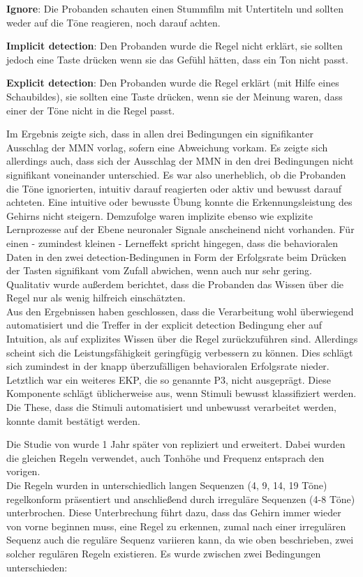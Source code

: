 \documentclass[doc,a4paper,12pt]{apa6}
\begin{document}
\begin{compactitem}
  \item \textbf{Ignore}: Die Probanden schauten einen Stummfilm mit Untertiteln und sollten weder auf die Töne reagieren, noch darauf achten.
  \item \textbf{Implicit detection}: Den Probanden wurde die Regel nicht erklärt, sie sollten jedoch eine Taste drücken wenn sie das Gefühl hätten, dass ein Ton nicht passt.
  \item \textbf{Explicit detection}: Den Probanden wurde die Regel erklärt (mit Hilfe eines Schaubildes), sie sollten eine Taste drücken, wenn sie der Meinung waren, dass einer der Töne nicht in die Regel passt.
\end{compactitem}

Im Ergebnis zeigte sich, dass in allen drei Bedingungen ein signifikanter Ausschlag der MMN vorlag, sofern eine Abweichung vorkam. Es zeigte sich allerdings auch, dass sich der Ausschlag der MMN in den drei Bedingungen nicht signifikant voneinander unterschied. Es war also unerheblich, ob die Probanden die Töne ignorierten, intuitiv darauf reagierten oder aktiv und bewusst darauf achteten. Eine intuitive oder bewusste Übung konnte die Erkennungsleistung des Gehirns nicht steigern. Demzufolge waren implizite ebenso wie explizite Lernprozesse auf der Ebene neuronaler Signale anscheinend nicht vorhanden. Für einen - zumindest kleinen - Lerneffekt spricht hingegen, dass die behavioralen Daten in den zwei detection-Bedingunen in Form der Erfolgsrate beim Drücken der Tasten signifikant vom Zufall abwichen, wenn auch nur sehr gering. Qualitativ wurde außerdem berichtet, dass die Probanden das Wissen über die Regel nur als wenig hilfreich einschätzten.\\
Aus den Ergebnissen haben \textcite{paavilainen2007preattentive} geschlossen, dass die Verarbeitung wohl überwiegend automatisiert und die Treffer in der explicit detection Bedingung eher auf Intuition, als auf explizites Wissen über die Regel zurückzuführen sind. Allerdings scheint sich die  Leistungsfähigkeit geringfügig verbessern zu können. Dies schlägt sich zumindest in der knapp überzufälligen behavioralen Erfolgsrate nieder. Letztlich war ein weiteres EKP, die so genannte P3, nicht ausgeprägt. Diese Komponente schlägt üblicherweise aus, wenn Stimuli bewusst klassifiziert werden. Die These, dass die Stimuli automatisiert und unbewusst verarbeitet werden, konnte damit bestätigt werden.

Die Studie von \textcite{paavilainen2007preattentive} wurde 1 Jahr später von \textcite{bendixen2008rapid} repliziert und erweitert. Dabei wurden die gleichen Regeln verwendet, auch Tonhöhe und Frequenz entsprach den vorigen.\\
Die Regeln wurden in unterschiedlich langen Sequenzen (4, 9, 14, 19 Töne) regelkonform präsentiert und anschließend durch irreguläre Sequenzen (4-8 Töne) unterbrochen. Diese Unterbrechung führt dazu, dass das Gehirn immer wieder von vorne beginnen muss, eine Regel zu erkennen, zumal nach einer irregulären Sequenz auch die reguläre Sequenz variieren kann, da wie oben beschrieben, zwei solcher regulären Regeln existieren. Es wurde zwischen zwei Bedingungen unterschieden:
\end{document}
